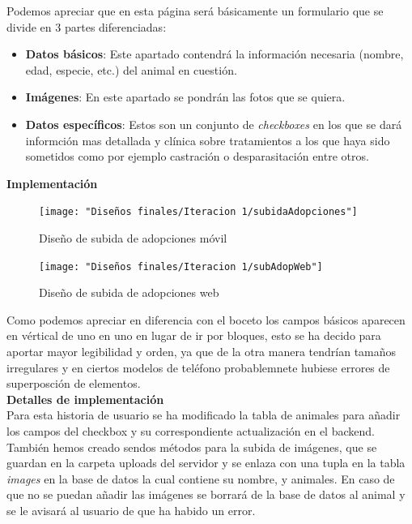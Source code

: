 Podemos apreciar que en esta página será básicamente un formulario que se divide en 3 partes diferenciadas: \\ 

\begin{itemize}
	\item \textbf{Datos básicos}: Este apartado contendrá la información necesaria (nombre, edad, especie, etc.) del animal en cuestión.
	\item \textbf{Imágenes}: En este apartado se pondrán las fotos que se quiera.
	\item \textbf{Datos específicos}: Estos son un conjunto de \textit{checkboxes} en los que se dará informción mas detallada y clínica sobre tratamientos a los que haya sido sometidos como por ejemplo castración o desparasitación entre otros.
\end{itemize}

\textbf{Implementación} \\

\begin{figure}[H]
	\centering
	\texttt{[image: "Diseños finales/Iteracion 1/subidaAdopciones"]}
	\caption{ Diseño de subida de adopciones móvil}
	\label{fig:subidaadopciones}
\end{figure}


\begin{figure}[H]
	\centering
	\texttt{[image: "Diseños finales/Iteracion 1/subAdopWeb"]}
	\caption{Diseño de subida de adopciones web}
	\label{fig:subadopweb}
\end{figure}

Como podemos apreciar en diferencia con el boceto los campos básicos aparecen en vértical de uno en uno en lugar de ir por bloques, esto se ha decido para aportar mayor legibilidad y orden, ya que de la otra manera tendrían tamaños irregulares y en ciertos modelos de teléfono probablemnete hubiese errores de superposción de elementos. \\


\textbf{Detalles de implementación} \\

Para esta historia de usuario se ha modificado la tabla de animales para añadir los campos del checkbox y su correspondiente actualización en el backend. También hemos creado sendos métodos para la subida de imágenes, que se guardan en la carpeta uploads del servidor y se enlaza con una tupla en la tabla \textit{images} en la base de datos la cual contiene su nombre, y animales. En caso de que no se puedan añadir las imágenes se borrará de la base de datos al animal y se le avisará al usuario de que ha habido un error. \\


